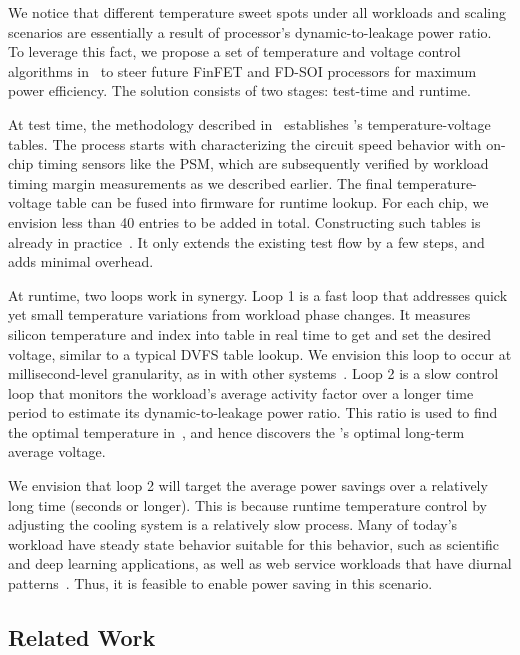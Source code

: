We notice that different temperature sweet spots under all workloads and scaling scenarios are essentially a result of processor's dynamic-to-leakage power ratio. To leverage this fact, we propose a set of temperature and voltage control algorithms in~ to steer future FinFET and FD-SOI processors for maximum power efficiency. The solution consists of two stages: test-time and runtime.

At test time, the methodology described in~ establishes \tistate's temperature-voltage tables.  The process starts with characterizing the circuit speed behavior with on-chip timing sensors like the PSM, which are subsequently verified by workload timing margin measurements as we described earlier. The final temperature-voltage table can be fused into firmware for runtime lookup. For each chip, we envision less than 40 entries to be added in total. Constructing such tables is already in practice~\cite{sriram2016avfs}. It only extends the existing test flow by a few steps, and adds minimal overhead.

At runtime, two loops work in synergy. Loop 1 is a fast loop that addresses quick yet small temperature variations from workload phase changes. It measures silicon temperature and index into \tistate table in real time to get and set the desired voltage, similar to a typical DVFS table lookup. We envision this loop to occur at millisecond-level granularity, as in with other systems~\cite{lefurgy2011active}. Loop 2 is a slow control loop that monitors the workload's average activity factor over a longer time period to estimate its dynamic-to-leakage power ratio. This ratio is used to find the optimal temperature in~, and hence discovers the \tistate's optimal long-term average voltage.

We envision that loop 2 will target the average power savings over a relatively long time (seconds or longer). This is because runtime temperature control by adjusting the cooling system is a relatively slow process. Many of today's workload have steady state behavior suitable for this behavior, such as scientific and deep learning applications, as well as web service workloads that have diurnal patterns~\cite{lo2014towards}. Thus, it is feasible to enable power saving in this scenario.

\subsection{Related Work}
\label{sec:tistate:related}

